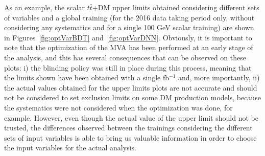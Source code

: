 \documentclass[a4paper, 10pt, openright]{report}
\begin{document}
\begin{appendices}

%

As an example, the scalar $t \bar t$+DM upper limits obtained considering different sets of variables and a global training (for the 2016 data taking period only, without considering any systematics and for a single 100 GeV scalar training) are shown in Figures~\ref{fig:optVarBDT} and~\ref{fig:optVarDNN}. Obviously, it is important to note that the optimization of the \ac{MVA} has been performed at an early stage of the analysis, and this has several consequences that can be observed on these plots: i) the blinding policy was still in place during this process, meaning that the limits shown have been obtained with a single fb$^{-1}$ and, more importantly, ii) the actual values obtained for the upper limits plots are not accurate and should not be considered to set exclusion limits on some \ac{DM} production models, because the systematics were not considered when the optimization was done, for example. However, even though the actual value of the upper limit should not be trusted, the differences observed between the trainings considering the different sets of input variables is able to bring us valuable information in order to choose the input variables for the actual analysis.


\end{appendices}
\end{document}
